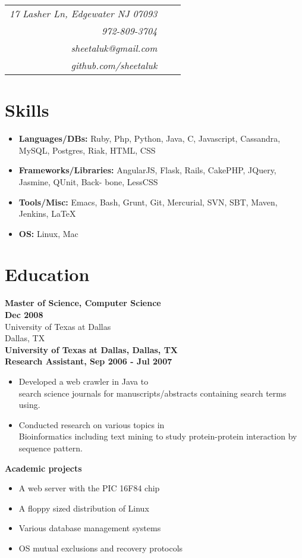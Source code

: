 \documentclass{article}
\begin{document}
\begin{minipage}[t]{3.4in}  
 \begin{tabular}{rrr}
   \vspace{0pt}
   \emph {17 Lasher Ln, Edgewater NJ 07093} \\
   \emph {972-809-3704} \\
   \emph {sheetaluk@gmail.com } \\
   \emph {github.com/sheetaluk } \\
 \end{tabular}
  \vspace{-5pt}
  \section*{Skills}
    \begin{itemize}
      \item {\bf Languages/DBs:} Ruby, Php, Python, Java, C,
Javascript, Cassandra, MySQL, Postgres, Riak,
HTML, CSS
      \item {\bf Frameworks/Libraries:} AngularJS, Flask,
Rails, CakePHP, JQuery, Jasmine, QUnit, Back-
bone, LessCSS
      \item {\bf Tools/Misc:} Emacs, Bash, Grunt, Git, Mercurial,
SVN, SBT, Maven, Jenkins, \LaTeX
      \item {\bf OS:} Linux, Mac
    \end{itemize}
     
  \section*{Education}
   {\bf Master of Science, Computer Science} \\
    {\bf Dec 2008} \\ 
    University of Texas at Dallas \\
    Dallas, TX \\
    
    {\bf University of Texas at Dallas, Dallas, TX }\\
      {\bf Research Assistant, Sep 2006 - Jul 2007}
      \begin{itemize}
    \item
      Developed a web crawler in Java to  \\ search science journals for manuscripts/abstracts containing search terms using. 
      \item 
      Conducted research on various topics in \\ Bioinformatics including text mining to study protein-protein interaction by sequence pattern.
    \end{itemize}
    {\bf Academic projects}
      \begin{itemize}
        \item A web server with the PIC 16F84 chip
        \item A floppy sized distribution of Linux
        \item Various database management systems
        \item OS mutual exclusions and recovery protocols\\
      \end{itemize}
          

\end{minipage}
\end{document}
